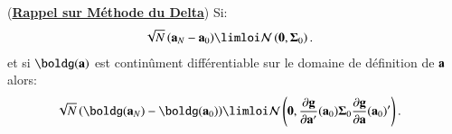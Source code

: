\begin{enumerate}
\begin{enumerate}
    \begin{remarque}(\textbf{\underline{Rappel sur Méthode du Delta}})
        Si:
        \begin{align*}
            \sqrt{N}\left(\bolda_N - \bolda_0\right)&\limloi \mathcal{N}\left(\boldzero, \boldSigma_0\right).
        \end{align*}
        et si $\boldg(\bolda)$ est continûment différentiable sur le domaine de définition de ${\mathbf a}$ alors:
\begin{align*}
    \sqrt{N}\left(\boldg(\bolda_N)-\boldg(\bolda_0)\right)&\limloi
     \mathcal{N}\left(\boldzero, 
    \frac{\partial \bold g}{\partial \bolda^\prime}(\bolda_0)\boldSigma_0 \frac{\partial \bold g}{\partial \bolda}(\bolda_0)^\prime\right).
\end{align*}
    \end{remarque}
\end{enumerate}
\end{enumerate}


 
